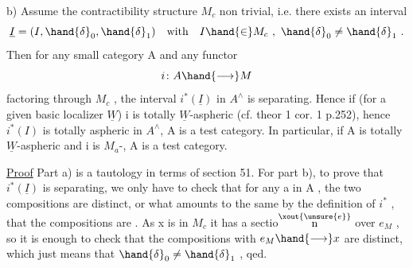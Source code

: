 
b)  Assume the contractibility structure $M_c$  non trivial,  i.e.
there exists an interval
\[ \underline{I} = (I,\hand{\delta}_0,\hand{\delta}_1) \quad \text{with} \quad I \hand{\in} M_c \ , \ \hand{\delta}_0 \neq \hand{\delta}_1 \ . \]
Then for any small category A and any functor
\[ i\colon A \hand{\longrightarrow} M \]
factoring through $M_c$ ,  the interval $i^*(\underline{I})$ in $A^\wedge$ is separating.  Hence
if  (for a given basic localizer $\underline{W}$) i is totally $\underline{W}$-aspheric (cf. theor
1 cor. 1  p.252),  hence $i^*(I)$ is totally aspheric in $A^\wedge$,  A is a test
category.  In particular,  if A is totally $\underline{W}$-aspheric and i is
$M_a$-,  A is a  test category.

\uline{Proof}   Part a) is a tautology in terms of section 51.  For part b),
to prove that $i^*(\underline{I})$ is separating,  we only have to check that for any
  a in A ,  the two compositions
are distinct,  or what amounts to the same by the definition of $i^*$ ,
that the compositions
are .  As  x is in $M_c$ it has a sectio$\overset{\xout{\unsure{e}}}{\text{n}}$ over $e_M$ ,  so it is enough
to check that the compositions with  $e_M \hand{\longrightarrow} x$  are distinct,  which just
means that  $\hand{\delta}_0 \neq \hand{\delta}_1$  , qed.

